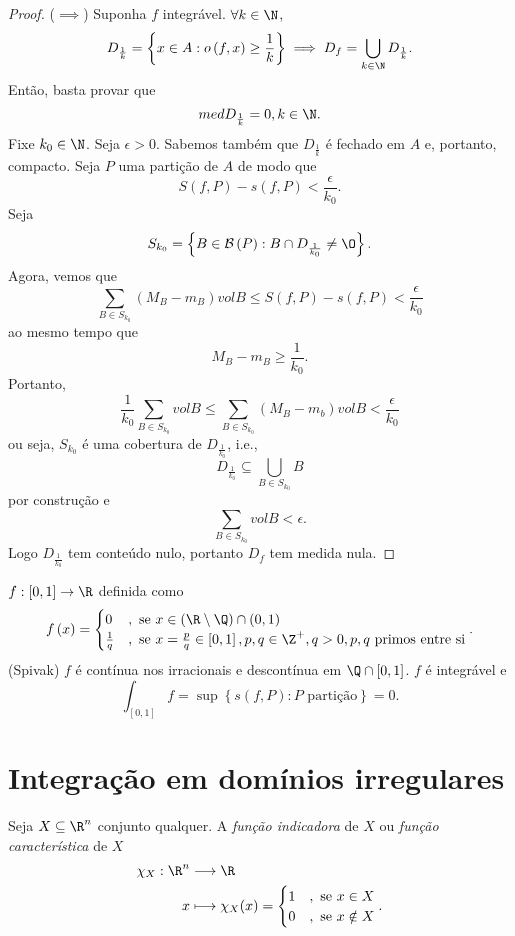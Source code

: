 \begin{proof}
    ($\implies$)
    Suponha $f$ integrável. $\forall k\in \N$, \[
    D_{\frac{1}{k}} = \left\{  x\in A : o\left( f,x \right) \ge \frac{1}{k}\right\}  \implies D_f = \bigcup_{k\in \N} D_{\frac{1}{k}}
    .\] Então, basta provar que \[
    med D_{\frac{1}{k}} = 0, k\in \N
    .\] Fixe $k_0\in \N$. Seja $\epsilon>0$. Sabemos também que $D_{\frac{1}{k}}$ é fechado em $A$ e, portanto, compacto. Seja $P$ uma partição de $A$ de modo que \[
    S\left( f,P \right)  - s\left( f,P \right)  < \frac{\epsilon}{k_0}
    .\] Seja \[
    S_{k_0} = \left\{ B\in \mathcal{B}\left( P \right) : B\cap D_{\frac{1}{k_0}}\neq \O \right\} 
    .\] Agora, vemos que \[
    \sum_{B\in S_{k_0}} \left( M_B - m_B \right) vol B \le S\left( f,P \right) -s\left( f,P \right) < \frac{\epsilon}{k_0}
    \] ao mesmo tempo que \[
    M_B - m_B \ge \frac{1}{k_0}
    .\] Portanto, \[
    \frac{1}{k_0}\sum_{B\in S_{k_0}} vol B \le \sum_{B\in S_{k_0}} \left( M_B-m_b \right) vol B < \frac{\epsilon}{k_0}
    \] ou seja, $S_{k_0}$ é uma cobertura de $D_{\frac{1}{k_0}}$, i.e., \[
    D_{\frac{1}{k_0}}\subseteq \bigcup_{B\in S_{k_0}} B
    \] por construção e \[
    \sum_{B\in S_{k_0}} vol B < \epsilon
    .\] Logo $D_{\frac{1}{k_0}}$ tem conteúdo nulo, portanto $D_f$ tem medida nula.
\end{proof}

\begin{eg}
    $f: \left[ 0,1 \right] \to \R$ definida como \[
    f\left( x \right) = \begin{cases}
	0 &, \text{ se }x\in \left( \R\setminus\Q \right) \cap \left( 0,1 \right) \\
	\frac{1}{q} &, \text{ se } x = \frac{p}{q} \in \left[ 0,1 \right] , p,q \in \Z^{+}, q>0, p,q \text{ primos entre si}
    \end{cases}
.\] (Spivak) $f$ é contínua nos irracionais e descontínua em $\Q \cap \left[ 0,1 \right] $. $f$ é integrável e \[
\int_{\left[ 0,1 \right] }f = \sup \left\{ s\left( f,P \right)  : P \text{ partição}\right\} = 0
.\] 
\end{eg}

\section*{Integração em domínios irregulares}

\begin{definition}
    Seja $X\subseteq\R^{n}$ conjunto qualquer. A \emph{função indicadora} de $X$ ou \emph{função característica} de $X$
    \begin{align*}
        \chi_X: \R^{n} &\longrightarrow \R \\
        x &\longmapsto \chi_X(x) = \begin{cases}
	    1 &, \text{ se }x\in X \\
	    0 &, \text{ se }x\notin X
        \end{cases}
    .\end{align*}
\end{definition}

